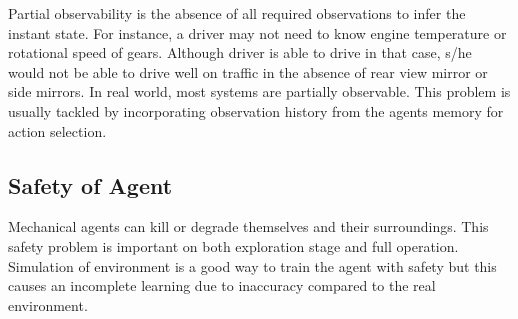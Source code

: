 Partial observability is the absence of all required observations to infer the instant state. 
For instance, a driver may not need to know engine temperature or rotational speed of gears. 
Although driver is able to drive in that case, s/he would not be able to drive well on traffic in the absence of rear view mirror or side mirrors. 
In real world, most systems are partially observable. 
This problem is usually tackled by incorporating observation history from the agents memory for action selection. 

\subsection{Safety of Agent}

Mechanical agents can kill or degrade themselves and their surroundings. 
This safety problem is important on both exploration stage and full operation. 
Simulation of environment is a good way to train the agent with safety but this causes an incomplete learning due to inaccuracy compared to the real environment. 
